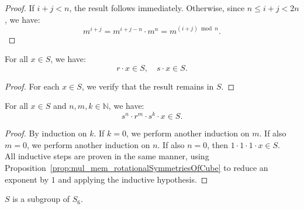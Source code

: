 \begin{proof}
  \leanok
  If $i + j < n$, the result follows immediately.  
  Otherwise, since $n \leq i + j < 2n$, we have:
  \begin{equation*}
    m^{i + j} = m^{i + j - n} \cdot m^n = m^{(i + j) \bmod n}.
  \end{equation*}
\end{proof}

\begin{proposition}
  \label{prop:mul_mem_rotationalSymmetriesOfCube}
  \leanok
  For all $x \in S$, we have:
  \begin{equation*}
    r \cdot x \in S, \quad s \cdot x \in S.
  \end{equation*}
\end{proposition}

\begin{proof}
  \leanok
  For each $x \in S$, we verify that the result remains in $S$.
\end{proof}

\begin{proposition}
  \label{prop:s-pow-r-pow-s-pow-mul-mem-rotationalSymmetriesOfCube}
  \leanok
  For all $x \in S$ and $n, m, k \in \mathbb{N}$, we have:
  \begin{equation*}
    s^n \cdot r^m \cdot s^k \cdot x \in S.
  \end{equation*}
\end{proposition}

\begin{proof}
  \leanok
  By induction on $k$. If $k = 0$, we perform another induction on $m$. If also $m = 0$, we perform another induction on $n$. If also $n = 0$, then $1 \cdot 1 \cdot 1 \cdot x \in S$. \\
  All inductive steps are proven in the same manner, using Proposition~\ref{prop:mul_mem_rotationalSymmetriesOfCube} to reduce an exponent by $1$ and applying the inductive hypothesis.
\end{proof}

\begin{proposition}
  \label{prop:RotationalSymmetriesOfCubeSubgroup}
  \leanok
  $S$ is a subgroup of $S_6$.
\end{proposition}

